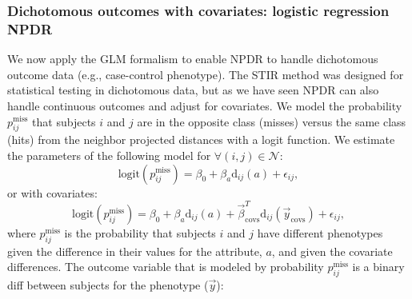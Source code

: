\documentclass[10pt]{article}
\begin{document}
\subsubsection{Dichotomous outcomes with covariates: logistic regression NPDR}
We now apply the GLM formalism to enable NPDR to handle dichotomous outcome data (e.g., case-control phenotype). The STIR method was designed for statistical testing in dichotomous data, but as we have seen NPDR can also handle continuous outcomes and adjust for covariates.
We model the probability $p^{\text{miss}}_{ij}$ that subjects $i$ and $j$ are in the opposite class (misses) versus the same class (hits) from the neighbor projected distances with a logit function. We estimate the parameters of the following model for $\forall(i,j) \in \mathcal{N}$:   
\begin{equation}\label{eq:logit_nocovar}
\text{logit}(p^{\text{miss}}_{ij}) = \beta_0 + \beta_a \text{d}_{ij}(a) + \epsilon_{ij},   
\end{equation}
or with covariates:
\begin{equation}\label{eq:too_logit}
\text{logit}(p^{\text{miss}}_{ij}) = \beta_0 + \beta_a \text{d}_{ij}(a) + \vec{\beta}^{T}_{\text{covs}} \text{d}_{ij}(\vec{y}_{\text{covs}}) + \epsilon_{ij},   
\end{equation}
where $p^{\text{miss}}_{ij}$ is the probability that subjects $i$ and $j$ have different phenotypes given the difference in their values for the attribute, $a$, and given the covariate differences.
The outcome variable that is modeled by probability $p^{\text{miss}}_{ij}$ is a binary diff between subjects for the phenotype ($\vec{y}$):
   
\end{document}
